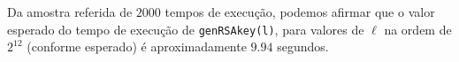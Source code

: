 \documentclass[dvipsnames]{article}
\begin{document}
\begin{multicols}{2}
  \vskip 0.2cm
  
  \noindent {}
  
  Da amostra referida de $2000$ tempos de execução, podemos afirmar que o valor esperado do tempo de execução de \texttt{genRSAkey(l)}, para valores de $\ell$ na ordem de $2^12$ (conforme esperado) é aproximadamente $9.94$ segundos.

  
  
  
\end{multicols}
\end{document}
